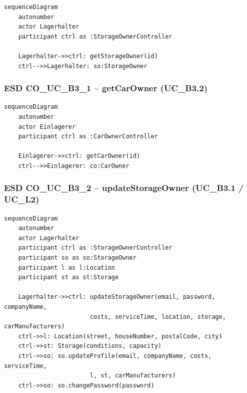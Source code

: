 \begin{lstlisting}[basicstyle=\ttfamily\small, breaklines=true]
sequenceDiagram
    autonumber
    actor Lagerhalter
    participant ctrl as :StorageOwnerController

    Lagerhalter->>ctrl: getStorageOwner(id)
    ctrl-->>Lagerhalter: so:StorageOwner
\end{lstlisting}

\newpage

{}
\subsubsection*{ESD CO\_UC\_B3\_1 – getCarOwner (UC\_B3.2)}

\begin{lstlisting}[basicstyle=\ttfamily\small, breaklines=true]
sequenceDiagram
    autonumber
    actor Einlagerer
    participant ctrl as :CarOwnerController

    Einlagerer->>ctrl: getCarOwner(id)
    ctrl-->>Einlagerer: co:CarOwner
\end{lstlisting}

\newpage

{}
\subsubsection*{ESD CO\_UC\_B3\_2 – updateStorageOwner (UC\_B3.1 / UC\_L2)}

\begin{lstlisting}[basicstyle=\ttfamily\small, breaklines=true]
sequenceDiagram
    autonumber
    actor Lagerhalter
    participant ctrl as :StorageOwnerController
    participant so as so:StorageOwner
    participant l as l:Location
    participant st as st:Storage

    Lagerhalter->>ctrl: updateStorageOwner(email, password, companyName,
                        costs, serviceTime, location, storage, carManufacturers)
    ctrl->>l: Location(street, houseNumber, postalCode, city)
    ctrl->>st: Storage(conditions, capacity)
    ctrl->>so: so.updateProfile(email, companyName, costs, serviceTime,
                        l, st, carManufacturers)
    ctrl->>so: so.changePassword(password)
\end{lstlisting}


